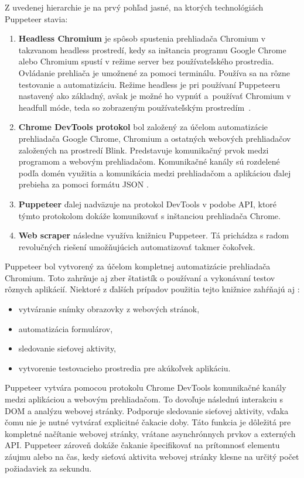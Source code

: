 \bigskip

Z uvedenej hierarchie je na prvý pohľad jasné, na ktorých technológiách Puppeteer stavia:

\begin{enumerate}
  \item \textbf{Headless Chromium} je spôsob spustenia prehliadača Chromium v takzvanom headless prostredí, kedy sa inštancia programu Google Chrome alebo Chromium spustí v režime server bez používateľského prostredia. Ovládanie prehliača je umožnené za pomoci terminálu. Používa sa na rôzne testovanie a automatizáciu. Režime headless je pri používaní Puppeteeru nastavený ako základný, avšak je možné ho vypnúť a~používať Chromium v headfull móde, teda so zobrazeným používateľským prostredím~\cite{chromium}.
  \item \textbf{Chrome DevTools protokol} bol založený za účelom automatizácie prehliadača Google Chrome, Chromium a ostatných webových prehliadačov založených na prostredí Blink. Predstavuje komunikačný prvok medzi programom a webovým prehliadačom. Komunikačné kanály sú rozdelené podľa domén využitia a komunikácia medzi prehliadačom a aplikáciou ďalej prebieha za pomoci formátu JSON \cite{devtools}.
  \item \textbf{Puppeteer} ďalej nadväzuje na protokol DevTools v podobe API, ktoré týmto protokolom dokáže komunikovať s inštanciou prehliadača Chrome.
  \item \textbf{Web scraper} následne využíva knižnicu Puppeteer. Tá prichádza s radom revolučných riešení umožňujúcich automatizovať takmer čokoľvek.
\end{enumerate}

\newpage

Puppeteer bol vytvorený za účelom kompletnej automatizácie prehliadača Chromium. Toto zahrňuje aj zber štatistík o používaní a vykonávaní testov rôznych aplikácií. Niektoré z ďalších prípadov použitia tejto knižnice zahŕňajú aj \cite{puppeteer}:
\begin{itemize}
    \item vytváranie snímky obrazovky z webových stránok,
    \item automatizácia formulárov,
    \item sledovanie sieťovej aktivity,
    \item vytvorenie testovacieho prostredia pre akúkoľvek aplikáciu.
\end{itemize}

\bigskip

Puppeteer vytvára pomocou protokolu Chrome DevTools komunikačné kanály medzi aplikáciou a webovým prehliadačom. To dovoľuje následnú interakciu s DOM a analýzu webovej stránky. Podporuje sledovanie sieťovej aktivity, vďaka čomu nie je nutné vytvárať explicitné čakacie doby. Táto funkcia je dôležitá pre kompletné načítanie webovej stránky, vrátane asynchrónnych prvkov a externých API. Puppeteer zároveň dokáže čakanie špecifikovať na prítomnosť elementu záujmu alebo na čas, kedy sieťová aktivita webovej stránky klesne na určitý počet požiadaviek za sekundu.

